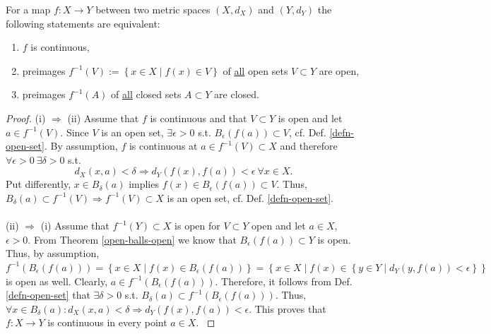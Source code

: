 \begin{theorem}\label{thrm:preimages_continuous_functions}
	For a map $f: X\rightarrow Y$ between two metric spaces $\left(X, d_{X} \right)$ and $\left(Y, d_{Y} \right)$ the following statements are equivalent: 
	\begin{enumerate}[label = (\roman*)]
		\item $f$ is continuous,
		\item preimages $f^{-1}(V) := \left\{ x\in X\mid f\left(x\right) \in V \right\}$ of \underline{all} open sets $V\subset Y$ are open,  
		\item preimages $f^{-1}(A)$ of \underline{all} closed sets $A\subset Y$ are closed. 	
	\end{enumerate}
\end{theorem}

\begin{proof}
	(i) $\Rightarrow$ (ii) Assume that $f$ is continuous and that $V\subset Y$ is open and let $a\in f^{-1}\left( V\right)$. Since $V$ is an open set, $\exists \epsilon > 0$ s.t. $B_{\epsilon}\left( f\left(a\right) \right)\subset V$, cf. Def. \ref{defn-open-set}. By assumption, $f$ is continuous at $a\in f^{-1}\left(V\right)\subset X$ and therefore $\forall \epsilon > 0 \ \exists \delta > 0$ s.t. 
	$$d_{X}\left(x, a\right) < \delta\Rightarrow d_{Y}\left(f\left(x\right), f\left(a\right)\right) < \epsilon \ \forall x\in X.$$ 
	Put differently, $x\in B_{\delta}\left( a\right)$ implies $f\left(x\right) \in B_{\epsilon}\left( f\left(a\right) \right) \subset V$. Thus, $B_{\delta}(a) \subset f^{-1}(V) \Rightarrow f^{-1}(V) \subset X$ is an open set, cf. Def. \ref{defn-open-set}. 
	\\ 
	\\ 
	(ii) $\Rightarrow$ (i) Assume that $f^{-1}\left(Y\right) \subset X$ is open for $V\subset Y$ open and let $a\in X$, $\epsilon > 0$. From Theorem \ref{open-balls-open} we know that $B_{\epsilon}\left(f\left(a\right)\right)\subset Y$ is open. Thus, by assumption, $f^{-1}\left( B_{\epsilon}\left( f\left(a\right) \right) \right) = \left\{ x\in X \mid f\left( x \right) \in B_{\epsilon}\left( f\left(a\right) \right) \right\} = \left\{ x\in X \mid f\left(x\right) \in \left\{ y\in Y\mid d_Y\left( y, f\left(a\right) \right) < \epsilon \right\}\right\}$ is open as well. Clearly, $a\in f^{-1}\left( B_{\epsilon}\left( f\left(a\right) \right) \right)$. Therefore, it follows from Def. \ref{defn-open-set} that $\exists\delta > 0$ s.t. $B_{\delta}(a) \subset f^{-1}\left( B_{\epsilon}\left( f\left(a\right) \right) \right)$. Thus, $\forall x\in B_{\delta}(a): d_{X}\left( x, a \right) < \delta \Rightarrow d_Y\left(f\left(x\right), f\left(a\right)\right) < \epsilon$. This proves that $f: X\rightarrow Y$ is continuous in every point $a\in X$. \cite{cont-functions-open-sets}   

\end{proof}
